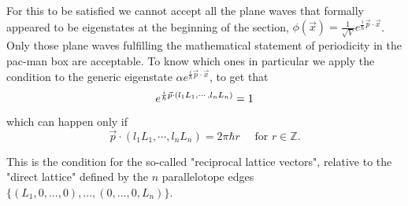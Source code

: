 \documentclass[11pt, a4paper]{article} %
\newcommand{\Z}{\mathbb{Z}} %
\DeclareRobustCommand{\mybox}[2][gray!10]{%
\begin{tcolorbox}[   %
        left=0.2cm,
        right=0.2cm,
        top=0.15cm,
        bottom=0.15cm,
        colback=#1,
        colframe=#1,
        width=\dimexpr\textwidth\relax, 
        enlarge left by=0mm,
        boxsep=5pt,
        arc=0pt,outer arc=0pt,
        ]
        #2
\end{tcolorbox}
}
\begin{document}
For this to be satisfied we cannot accept all the plane waves that formally appeared to be eigenstates at the beginning of the section, $\phi(\vec{x})=\frac{1}{\sqrt{V}}e^{\frac{i}{\hbar}\vec{p}\cdot \vec{x}}$. Only those plane waves fulfilling the mathematical statement of periodicity in the pac-man box are acceptable. To know which ones in particular we apply the condition to the generic eigenstate $\alpha e^{\frac{i}{\hbar}\vec{p}\cdot \vec{x}}$, to get that
\begin{equation}
e^{\frac{i}{\hbar}\vec{p}\cdot\qty({l_1L_1,\cdots ,l_nL_n})}=1
\end{equation}
which can happen only if
\begin{equation}
\vec{p}\cdot( l_1L_1,\cdots, l_nL_n)=2\pi \hbar r \quad \text{ for } r\in\Z.\label{condp}
\end{equation}
\mybox{
This is the condition for the so-called "reciprocal lattice vectors", relative to the "direct lattice" defined by the $n$ parallelotope edges $\{(L_1,0,...,0), ..., (0,...,0,L_n)\}$.
}
\end{document}
